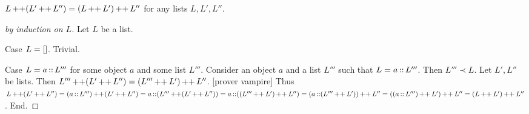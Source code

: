 \documentclass[10pt]{article}
\begin{document}
  \begin{forthel}
    \begin{proposition}
      $L \mathop{++} (L' \mathop{++} L'') = (L \mathop{++} L') \mathop{++} L''$ for any lists $L, L', L''$.
    \end{proposition}
    \begin{proof}[by induction on $L$]
      Let $L$ be a list.

      Case $L = []$. Trivial.

      Case $L = a \mathop{::} L'''$ for some object $a$ and some list $L'''$.
        Consider an object $a$ and a list $L'''$ such that $L = a \mathop{::} L'''$.
        Then $L''' \prec L$.
        Let $L',L''$ be lists.
        Then $L''' \mathop{++} (L' \mathop{++} L'') = (L''' \mathop{++} L') \mathop{++} L''$.
        [prover vampire]
        Thus $L \mathop{++} (L' \mathop{++} L'') 
          = (a \mathop{::} L''') \mathop{++} (L' \mathop{++} L'')
          = a \mathop{::} (L''' \mathop{++} (L' \mathop{++} L''))
          = a \mathop{::} ((L''' \mathop{++} L') \mathop{++} L'')
          = (a \mathop{::} (L''' \mathop{++} L')) \mathop{++} L''
          = ((a \mathop{::} L''') \mathop{++} L') \mathop{++} L''
          = (L \mathop{++} L') \mathop{++} L''$.
      End.
    \end{proof}
  \end{forthel}
\end{document}
